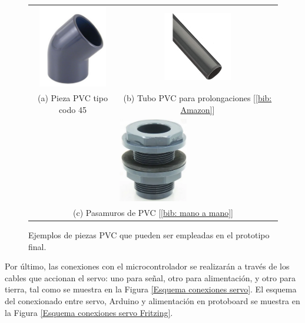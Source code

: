\documentclass[12pt]{article}
\begin{document}
	\begin{figure}[h]
		\begin{center}
			\begin{tabular}{cc}
				\includegraphics[width=30mm]{img/pieza_pvc_codo45.png} &   \includegraphics[width=30mm]{img/tubo_pvc.jpg} \\
				(a) Pieza PVC tipo codo 45\degree [\ref{bib: Poolaria}] & (b) Tubo PVC para prolongaciones [\ref{bib: Amazon}]\\[6pt]
				\multicolumn{2}{c}{\includegraphics[width=30mm]{img/pasamuro_pvc.png} }\\
				\multicolumn{2}{c}{(c) Pasamuros de PVC [\ref{bib: mano a mano}]}
			\end{tabular}
			\caption{Ejemplos de piezas PVC que pueden ser empleadas en el prototipo final.}
			\label{fig: piezas PVC posibles.}
		\end{center}
	\end{figure}
	
	\pagebreak
	
	\noindent Por último, las conexiones con el microcontrolador se realizarán a través de los cables que accionan el servo: uno para señal, otro para alimentación, y otro para tierra, tal como se muestra en la Figura \ref{Esquema conexiones servo}. El esquema del conexionado entre servo, Arduino y alimentación en protoboard se muestra en la Figura \ref{Esquema conexiones servo Fritzing}.\\
	
\end{document}
